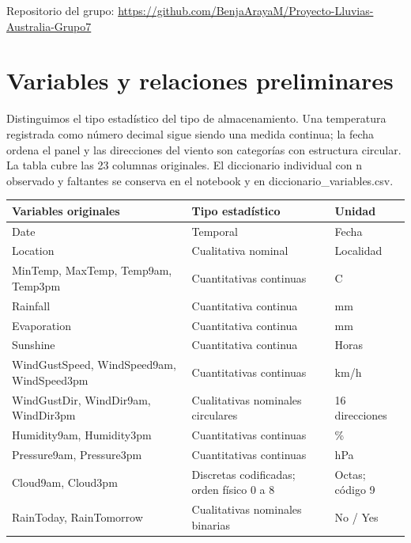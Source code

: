 \documentclass[11pt,a4paper]{article}
\begin{document}
{\small Repositorio del grupo: \url{https://github.com/BenjaArayaM/Proyecto-Lluvias-Australia-Grupo7}\par}

\clearpage


\section{Variables y relaciones preliminares}

Distinguimos el tipo estadístico del tipo de almacenamiento. Una temperatura registrada como número decimal sigue siendo una medida continua; la fecha ordena el panel y las direcciones del viento son categorías con estructura circular. La tabla cubre las 23 columnas originales. El diccionario individual con n observado y faltantes se conserva en el notebook y en diccionario\_variables.csv.


\begin{table}[H]
\centering
\small
\renewcommand{\arraystretch}{1.18}
\setlength{\tabcolsep}{5pt}
\begin{tabularx}{\linewidth}{@{}L{5.7cm}L{6.0cm}Y@{}}
\toprule

\textbf{Variables originales} & \textbf{Tipo estadístico} & \textbf{Unidad} \\
\midrule

Date & Temporal & Fecha \\

Location & Cualitativa nominal & Localidad \\

MinTemp, MaxTemp, Temp9am, Temp3pm & Cuantitativas continuas & \textdegree{}C \\

Rainfall & Cuantitativa continua & mm \\

Evaporation & Cuantitativa continua & mm \\

Sunshine & Cuantitativa continua & Horas \\

WindGustSpeed, WindSpeed9am, WindSpeed3pm & Cuantitativas continuas & km/h \\

WindGustDir, WindDir9am, WindDir3pm & Cualitativas nominales circulares & 16 direcciones \\

Humidity9am, Humidity3pm & Cuantitativas continuas & \% \\

Pressure9am, Pressure3pm & Cuantitativas continuas & hPa \\

Cloud9am, Cloud3pm & Discretas codificadas; orden físico 0 a 8 & Octas; código 9 \\

RainToday, RainTomorrow & Cualitativas nominales binarias & No / Yes \\

\bottomrule
\end{tabularx}

\end{table}
\end{document}
